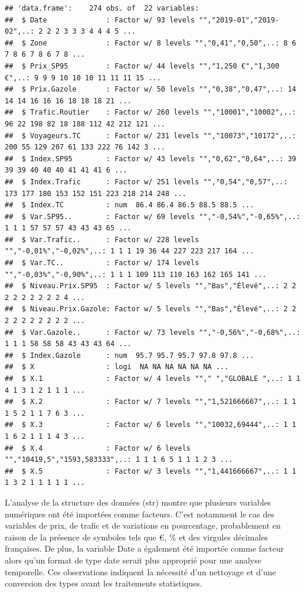 \documentclass[
]{article}
\begin{document}
\begin{verbatim}
## 'data.frame':    274 obs. of  22 variables:
##  $ Date              : Factor w/ 93 levels "","2019-01","2019-02",..: 2 2 2 3 3 3 4 4 4 5 ...
##  $ Zone              : Factor w/ 8 levels "","0,41","0,50",..: 8 6 7 8 6 7 8 6 7 8 ...
##  $ Prix_SP95         : Factor w/ 44 levels "","1,250 €","1,300 €",..: 9 9 9 10 10 10 11 11 11 15 ...
##  $ Prix.Gazole       : Factor w/ 50 levels "","0,38","0,47",..: 14 14 14 16 16 16 18 18 18 21 ...
##  $ Trafic.Routier    : Factor w/ 260 levels "","10001","10002",..: 96 22 198 82 18 188 112 42 212 121 ...
##  $ Voyageurs.TC      : Factor w/ 231 levels "","10073","10172",..: 200 55 129 207 61 133 222 76 142 3 ...
##  $ Index.SP95        : Factor w/ 43 levels "","0,62","0,64",..: 39 39 39 40 40 40 41 41 41 6 ...
##  $ Index.Trafic      : Factor w/ 251 levels "","0,54","0,57",..: 173 177 180 153 152 151 223 218 214 248 ...
##  $ Index.TC          : num  86.4 86.4 86.5 88.5 88.5 ...
##  $ Var.SP95..        : Factor w/ 69 levels "","-0,54%","-0,65%",..: 1 1 1 57 57 57 43 43 43 65 ...
##  $ Var.Trafic..      : Factor w/ 228 levels "","-0,01%","-0,02%",..: 1 1 1 19 36 44 227 223 217 164 ...
##  $ Var.TC..          : Factor w/ 174 levels "","-0,03%","-0,90%",..: 1 1 1 109 113 110 163 162 165 141 ...
##  $ Niveau.Prix.SP95  : Factor w/ 5 levels "","Bas","Élevé",..: 2 2 2 2 2 2 2 2 2 4 ...
##  $ Niveau.Prix.Gazole: Factor w/ 5 levels "","Bas","Élevé",..: 2 2 2 2 2 2 2 2 2 2 ...
##  $ Var.Gazole..      : Factor w/ 73 levels "","-0,56%","-0,68%",..: 1 1 1 58 58 58 43 43 43 64 ...
##  $ Index.Gazole      : num  95.7 95.7 95.7 97.8 97.8 ...
##  $ X                 : logi  NA NA NA NA NA NA ...
##  $ X.1               : Factor w/ 4 levels ""," ","GLOBALE ",..: 1 1 4 1 3 1 2 1 1 1 ...
##  $ X.2               : Factor w/ 7 levels "","1,521666667",..: 1 1 1 5 2 1 1 7 6 3 ...
##  $ X.3               : Factor w/ 6 levels "","10032,69444",..: 1 1 1 6 2 1 1 1 4 3 ...
##  $ X.4               : Factor w/ 6 levels "","10419,5","1593,583333",..: 1 1 1 6 5 1 1 1 2 3 ...
##  $ X.5               : Factor w/ 3 levels "","1,441666667",..: 1 1 1 3 2 1 1 1 1 1 ...
\end{verbatim}

L'analyse de la structure des données (str) montre que plusieurs
variables numériques ont été importées comme facteurs. C'est notamment
le cas des variables de prix, de trafic et de variations en pourcentage,
probablement en raison de la présence de symboles tels que €, \% et des
virgules décimales françaises. De plus, la variable Date a également été
importée comme facteur alors qu'un format de type date serait plus
approprié pour une analyse temporelle. Ces observations indiquent la
nécessité d'un nettoyage et d'une conversion des types avant les
traitements statistiques.
\end{document}
